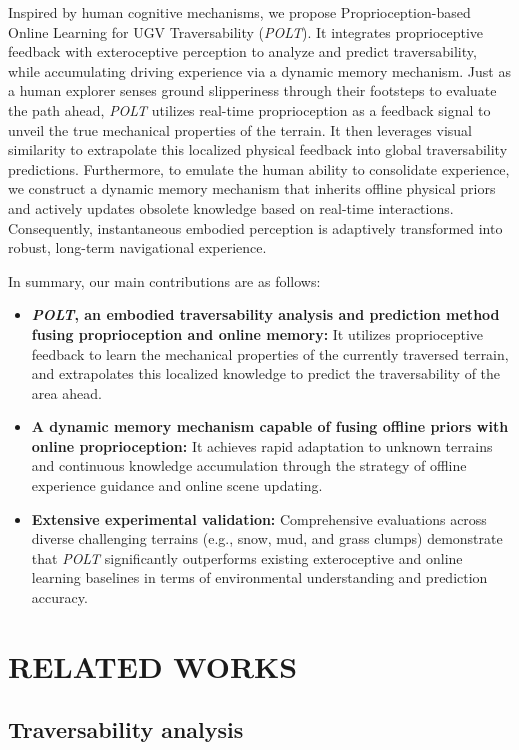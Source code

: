 \documentclass[letterpaper, 10 pt, conference]{ieeeconf}  %
\begin{document}
Inspired by human cognitive mechanisms, we propose Proprioception-based Online Learning for UGV Traversability (\textit{POLT}). It integrates proprioceptive feedback with exteroceptive perception to analyze and predict traversability, while accumulating driving experience via a dynamic memory mechanism. Just as a human explorer senses ground slipperiness through their footsteps to evaluate the path ahead, \textit{POLT} utilizes real-time proprioception as a feedback signal to unveil the true mechanical properties of the terrain. It then leverages visual similarity to extrapolate this localized physical feedback into global traversability predictions. Furthermore, to emulate the human ability to consolidate experience, we construct a dynamic memory mechanism that inherits offline physical priors and actively updates obsolete knowledge based on real-time interactions. Consequently, instantaneous embodied perception is adaptively transformed into robust, long-term navigational experience.

In summary, our main contributions are as follows:
\begin{itemize}
\item \textbf{\textit{POLT}, an embodied traversability analysis and prediction method fusing proprioception and online memory:} It utilizes proprioceptive feedback to learn the mechanical properties of the currently traversed terrain, and extrapolates this localized knowledge to predict the traversability of the area ahead.
\item \textbf{A dynamic memory mechanism capable of fusing offline priors with online proprioception:} It achieves rapid adaptation to unknown terrains and continuous knowledge accumulation through the strategy of offline experience guidance and online scene updating.
\item \textbf{Extensive experimental validation:} Comprehensive evaluations across diverse challenging terrains (e.g., snow, mud, and grass clumps) demonstrate that \textit{POLT} significantly outperforms existing exteroceptive and online learning baselines in terms of environmental understanding and prediction accuracy.
\end{itemize}


\section{RELATED WORKS}

\subsection{Traversability analysis}
\end{document}
